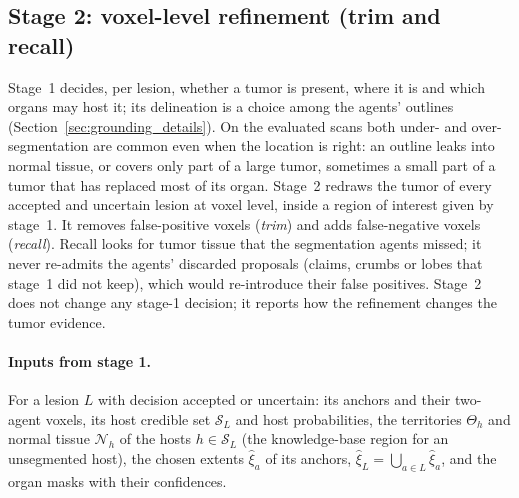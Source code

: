 \documentclass[fleqn,10pt]{olplainarticle}
\begin{document}
\subsection{Stage 2: voxel-level refinement (trim and recall)}
\label{sec:stage2}

Stage~1 decides, per lesion, whether a tumor is present, where it is and which organs may host it; its delineation is a
choice among the agents' outlines (Section~\ref{sec:grounding_details}). On the evaluated scans both under- and
over-segmentation are common even when the location is right: an outline leaks into normal tissue, or covers only part of
a large tumor, sometimes a small part of a tumor that has replaced most of its organ. Stage~2 redraws the tumor of every
accepted and uncertain lesion at voxel level, inside a region of interest given by stage~1. It removes false-positive voxels
(\emph{trim}) and adds false-negative voxels (\emph{recall}). Recall looks for tumor tissue that the segmentation agents
missed; it never re-admits the agents' discarded proposals (claims, crumbs or lobes that stage~1 did not keep), which
would re-introduce their false positives. Stage~2 does not change any stage-1 decision; it reports how the refinement
changes the tumor evidence.

\paragraph{Inputs from stage 1.} For a lesion $L$ with decision accepted or uncertain: its anchors and their two-agent
voxels, its host credible set $\mathcal{S}_L$ and host probabilities, the territories $\Theta_h$ and normal tissue
$\mathcal{N}_h$ of the hosts $h\in\mathcal{S}_L$ (the knowledge-base region for an unsegmented host), the chosen extents
$\hat\xi_a$ of its anchors, $\hat\xi_L=\bigcup_{a\in L}\hat\xi_a$, and the organ masks with their confidences.
\end{document}
